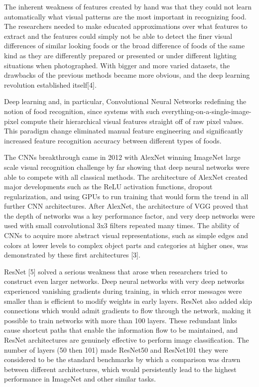 \documentclass[12pt, openany]{report}
\begin{document}
The inherent weakness of features created by hand was that they could not learn automatically what visual patterns are the most important in recognizing food. The researchers needed to make educated approximations over what features to extract and the features could simply not be able to detect the finer visual differences of similar looking foods or the broad difference of foods of the same kind as they are differently prepared or presented or under different lighting situations when photographed. With bigger and more varied datasets, the drawbacks of the previous methods became more obvious, and the deep learning revolution established itself[4].

Deep learning and, in particular, Convolutional Neural Networks redefining the notion of food recognition, since systems with such everything-on-a-single-image-pixel compute their hierarchical visual features straight off of raw pixel values. This paradigm change eliminated manual feature engineering and significantly increased feature recognition accuracy between different types of foods.

The CNNs breakthrough came in 2012 with AlexNet winning ImageNet large scale visual recognition challenge by far showing that deep neural networks were able to compete with all classical methods. The architecture of AlexNet created major developments such as the ReLU activation functions, dropout regularization, and using GPUs to run training that would form the trend in all further CNN architectures. After AlexNet, the architecture of VGG proved that the depth of networks was a key performance factor, and very deep networks were used with small convolutional 3x3 filters repeated many times. The ability of CNNs to acquire more abstract visual representations, such as simple edges and colors at lower levels to complex object parts and categories at higher ones, was demonstrated by these first architectures [3].

ResNet [5] solved a serious weakness that arose when researchers tried to construct even larger networks. Deep neural networks with very deep networks experienced vanishing gradients during training, in which error messages were smaller than is efficient to modify weights in early layers. ResNet also added skip connections which would admit gradients to flow through the network, making it possible to train networks with more than 100 layers. These redundant links cause shortcut paths that enable the information flow to be maintained, and ResNet architectures are genuinely effective to perform image classification. The number of layers (50 then 101) made ResNet50 and ResNet101 they were considered to be the standard benchmarks by which a comparison was drawn between different architectures, which would persistently lead to the highest performance in ImageNet and other similar tasks.
\end{document}
